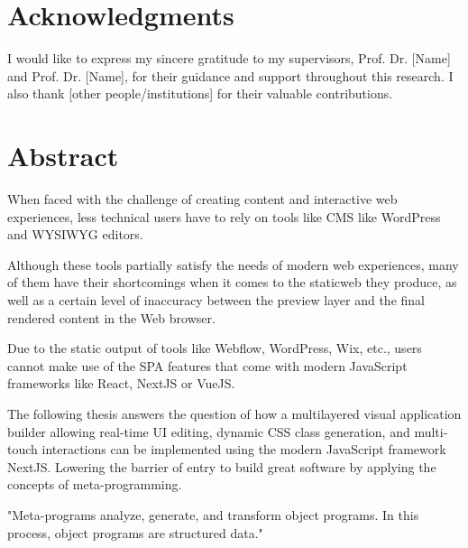 \documentclass[oneside,12pt]{book}
\let\oldtableofcontents\tableofcontents
\renewcommand{\tableofcontents}{%
  {\small
    \oldtableofcontents
  }%
  \renewcommand{\contentsname}{}%
}
\let\oldmainmatter\mainmatter
\renewcommand{\mainmatter}{
  \oldmainmatter
  \pagestyle{mainmatter}
}
\begin{document}
\tableofcontents

\chapter*{Acknowledgments}
I would like to express my sincere gratitude to my supervisors, Prof. Dr. [Name] and Prof. Dr. [Name], for their guidance and support throughout this research. I also thank [other people/institutions] for their valuable contributions.

\chapter*{Abstract}
When faced with the challenge of creating content and interactive web experiences, less technical users have to rely on tools like \gls{CMS} like WordPress and \gls{WYSIWYG} editors.


Although these tools partially satisfy the needs of modern web experiences, many of them have their shortcomings when it comes to the \gls{staticweb} they produce, as well as a certain level of inaccuracy between the preview layer and the final rendered content in the Web browser.


Due to the static output of tools like Webflow, WordPress, Wix, etc., users cannot make use of the \gls{SPA} features that come with modern JavaScript frameworks like React, NextJS or VueJS.


The following thesis answers the question of how a multilayered visual application builder allowing real-time UI editing, dynamic CSS class generation, and multi-touch interactions can be implemented using the modern JavaScript framework NextJS. Lowering the barrier of entry to build great software by applying the concepts of meta-programming.

"Meta-programs analyze, generate, and transform object programs. In this process, object programs are structured data."

\newpage
{}
\listoffigures

\newpage
{}
\listoftables

\newpage
{}
\lstlistoflistings

\mainmatter
\end{document}
